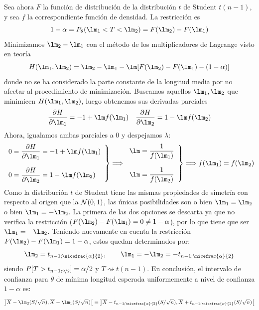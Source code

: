 \documentclass[12pt]{article}
\begin{document}
\begin{ejercicio}[2 puntos]
\begin{enumerate}[label=\alph*)]
            Sea ahora $F$ la función de distribución de la distribución $t$ de Student $t(n-1)$, 
            y sea $f$ la correspondiente función de densidad. La restricción es 
            $$1 - \alpha = P_\theta(\lm_1 < T < \lm_2) = F(\lm_2) - F(\lm_1)$$
            Minimizamos $\lm_2 - \lm_1$ con el método de los multiplicadores de Lagrange visto en teoría
            $$H(\lm_1, \lm_2) = \lm_2 - \lm_1 - \lm[F(\lm_2) - F(\lm_1) - (1-\alpha)]$$
            donde no se ha considerado la parte constante de la longitud media por no afectar al procedimiento de minimización.
            Buscamos aquellos $\lm_1, \lm_2$ que minimicen $H(\lm_1, \lm_2)$, luego obtenemos sus derivadas parciales
            $$\dfrac{\partial H}{\partial \lm_1} = - 1 + \lm f(\lm_1) \quad 
            \dfrac{\partial H}{\partial \lm_2} = 1 - \lm f(\lm_2)$$
            Ahora, igualamos ambas parciales a $0$ y despejamos $\lambda$:
            \begin{equation*}
                \left.\begin{array}{l}
                    0 = \dfrac{\partial H}{\partial \lm_1} = -1+\lm f(\lm_1) \\\\
                    0 = \dfrac{\partial H}{\partial \lm_2} = 1-\lm f(\lm_2)
                \end{array}\right\} \Longrightarrow \left.\begin{array}{l}
                    \lm = \dfrac{1}{f(\lm_1)} \\\\
                    \lm = \dfrac{1}{f(\lm_2)}
                \end{array}\right\} \Longrightarrow f(\lm_1) = f(\lm_2)
            \end{equation*}
            Como la distribución $t$ de Student tiene las mismas propiedades de simetría 
            con respecto al origen que la $\mathcal{N}(0, 1)$, las únicas posibilidades son o bien 
            $\lm_1 = \lm_2$ o bien $\lm_1 = -\lm_2$. La primera de las dos opciones se descarta ya que no verifica la restricción ($F(\lm_2) - F(\lm_1) = 0 \neq 1-\alpha$), 
            por lo que tiene que ser $\lm_1 = -\lm_2$. Teniendo nuevamente en cuenta la restricción $F(\lm_2) - F(\lm_1) = 1-\alpha$, estos quedan determinados por:
            \begin{equation*}
                \lm_2 = t_{n-1; \nicefrac{\alpha}{2}}, \qquad \lm_1 = -\lm_2 = -t_{n-1; \nicefrac{\alpha}{2}}
            \end{equation*}
            siendo $P[T > t_{n-1; \nicefrac{\alpha}{2}}] = \alpha/2$ y $T \rightsquigarrow t(n-1)$.
            En conclusión, el intervalo de confianza para $\theta$ de mínima longitud esperada uniformemente a nivel de confianza $1-\alpha$ es:
            \begin{equation*}
                \left] \overline{X} - \lm_2(S / \sqrt{n}), \overline{X} - \lm_1(S / \sqrt{n}) \right[ = \left] \overline{X} - t_{n-1; \nicefrac{\alpha}{2}}(S / \sqrt{n}), \overline{X} + t_{n-1; \nicefrac{\alpha}{2}}(S / \sqrt{n}) \right[
            \end{equation*}


\end{enumerate}
\end{ejercicio}
\end{document}
